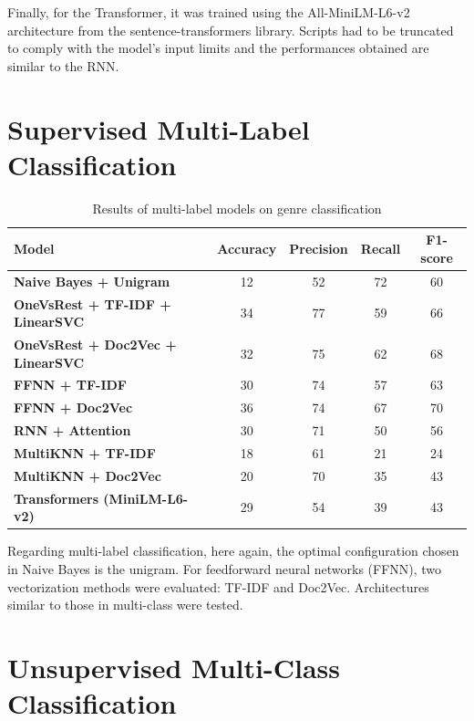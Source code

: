 \documentclass[12pt]{report}
\begin{document}
Finally, for the Transformer, it was trained using the All-MiniLM-L6-v2 architecture from the sentence-transformers library. Scripts had to be truncated to comply with the model's input limits and the performances obtained are similar to the RNN. 

\section{Supervised Multi-Label Classification}

\begin{table}[H]
\centering
\begin{tabular}{|l|c|c|c|c|}
\hline
\textbf{Model} & \textbf{Accuracy} & \textbf{Precision} & \textbf{Recall} & \textbf{F1-score} \\
\hline
\textbf{Naive Bayes + Unigram}                      & 12 & 52 & 72 & 60 \\
\textbf{OneVsRest + TF-IDF + LinearSVC }             & 34 & 77 & 59 & 66 \\
\textbf{OneVsRest + Doc2Vec + LinearSVC}             & 32 & 75 & 62 & 68 \\
\textbf{FFNN + TF-IDF }                                & 30 & 74 & 57 & 63 \\
\textbf{FFNN + Doc2Vec}                                & 36 & 74 & 67 & 70 \\
\textbf{RNN + Attention}                              & 30 & 71 & 50 & 56 \\
\textbf{MultiKNN + TF-IDF}                            & 18 & 61 & 21 & 24 \\
\textbf{MultiKNN + Doc2Vec }                          & 20 & 70 & 35 & 43 \\
\textbf{Transformers (MiniLM-L6-v2)  }                & 29 & 54 & 39 & 43 \\
\hline
\end{tabular}
\caption{Results of multi-label models on genre classification}
\label{tab:multilabel_results}
\end{table}

Regarding multi-label classification, here again, the optimal configuration chosen in Naive Bayes is the unigram. For feedforward neural networks (FFNN), two vectorization methods were evaluated: TF-IDF and Doc2Vec. Architectures similar to those in multi-class were tested. 

\section{Unsupervised Multi-Class Classification}
\end{document}

